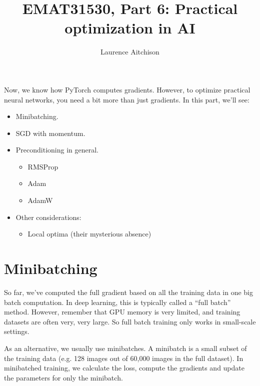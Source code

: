 \documentclass{article}
\title{EMAT31530, Part 6: Practical optimization in AI}
\author{Laurence Aitchison}
\date{}
\newcommand{\0}{\mathbf{0}}
\begin{document}
\maketitle

Now, we know how PyTorch computes gradients.
However, to optimize practical neural networks, you need a bit more than just gradients.
In this part, we'll see:
\begin{itemize}
  \item Minibatching.
  \item SGD with momentum.
  \item Preconditioning in general.
  \begin{itemize}
    \item RMSProp
    \item Adam
    \item AdamW
  \end{itemize}
  \item Other considerations:
  \begin{itemize}
    \item Local optima (their mysterious absence)
  \end{itemize}
\end{itemize}

\section{Minibatching}
So far, we've computed the full gradient based on all the training data in one big batch computation.
In deep learning, this is typically called a ``full batch'' method.
However, remember that GPU memory is very limited, and training datasets are often very, very large.
So full batch training only works in small-scale settings.

As an alternative, we usually use minibatches.
A minibatch is a small subset of the training data (e.g. 128 images out of 60,000 images in the full dataset).
In minibatched training, we calculate the loss, compute the gradients and update the parameters for only the minibatch.
\end{document}
